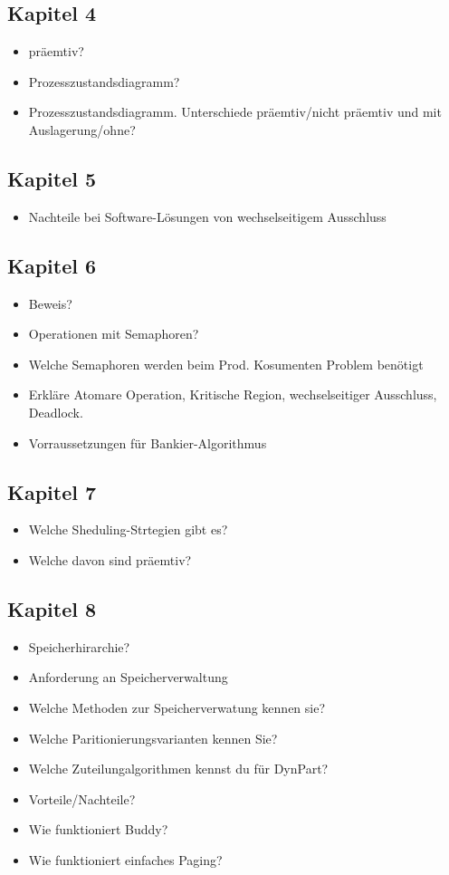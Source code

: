 \documentclass[10pt,a4paper]{article}
\begin{document}
\subsection*{Kapitel 4}
\begin{itemize}
\item präemtiv?
\item Prozesszustandsdiagramm?
\item Prozesszustandsdiagramm. Unterschiede präemtiv/nicht präemtiv und mit Auslagerung/ohne?
\end{itemize}

\subsection*{Kapitel 5}
\begin{itemize}
\item Nachteile bei Software-Lösungen von wechselseitigem Ausschluss 
\end{itemize}

\subsection*{Kapitel 6}
\begin{itemize}
\item Beweis?
\item Operationen mit Semaphoren?
\item Welche Semaphoren werden beim Prod. Kosumenten Problem benötigt
\item Erkläre Atomare Operation, Kritische Region, wechselseitiger Ausschluss, Deadlock.
\item Vorraussetzungen für Bankier-Algorithmus
\end{itemize}

\subsection*{Kapitel 7}

\begin{itemize}
\item Welche Sheduling-Strtegien gibt es?
\item Welche davon sind präemtiv?
\end{itemize}

\subsection*{Kapitel 8}

\begin{itemize}
\item Speicherhirarchie?
\item Anforderung an Speicherverwaltung
\item Welche Methoden zur Speicherverwatung kennen sie?
\item Welche Paritionierungsvarianten kennen Sie?
\item Welche Zuteilungalgorithmen kennst du für DynPart?
\item Vorteile/Nachteile?
\item Wie funktioniert Buddy?
\item Wie funktioniert einfaches Paging?
\end{itemize}
\end{document}
